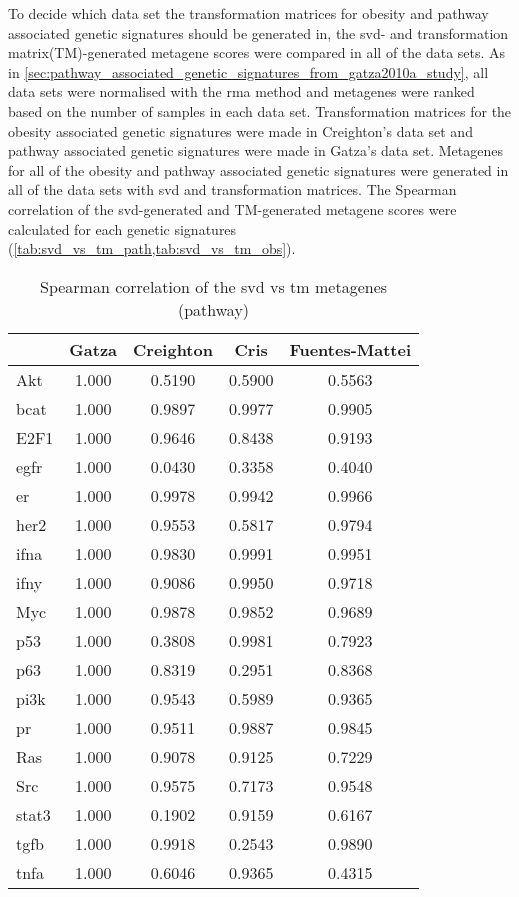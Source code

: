 To decide which data set the transformation matrices for obesity and pathway associated genetic signatures should be generated in, the \gls{svd}- and transformation matrix(TM)-generated metagene scores were compared in all of the data sets.
As in \cref{sec:pathway_associated_genetic_signatures_from_gatza2010a_study}, all data sets were normalised with the \gls{rma} method and metagenes were ranked based on the number of samples in each data set.
Transformation matrices for the obesity associated genetic signatures were made in Creighton's data set and pathway associated genetic signatures were made in Gatza's data set.
Metagenes for all of the obesity and pathway associated genetic signatures were generated in all of the data sets with \gls{svd} and transformation matrices.
The Spearman correlation of the \gls{svd}-generated and TM-generated metagene scores were calculated for each genetic signatures (\cref{tab:svd_vs_tm_path,tab:svd_vs_tm_obs}).

\begin{table}[htpb]
	\centering
	\caption{Spearman correlation of the svd vs tm metagenes (pathway)}
	\label{tab:svd_vs_tm_path}
	\begin{tabular}{lcccc}
		& Gatza & Creighton & Cris & Fuentes-Mattei\\
		\hline
		\rule{0pt}{2.25ex}Akt & 1.000 & 0.5190 & 0.5900 & 0.5563 \\
		\gls{bcat}            & 1.000 & 0.9897 & 0.9977 & 0.9905 \\
		E2F1                  & 1.000 & 0.9646 & 0.8438 & 0.9193 \\
		\gls{egfr}            & 1.000 & 0.0430 & 0.3358 & 0.4040 \\
		\gls{er}              & 1.000 & 0.9978 & 0.9942 & 0.9966 \\
		\gls{her2}            & 1.000 & 0.9553 & 0.5817 & 0.9794 \\
		\gls{ifna}            & 1.000 & 0.9830 & 0.9991 & 0.9951 \\
		\gls{ifny}            & 1.000 & 0.9086 & 0.9950 & 0.9718 \\
		Myc                   & 1.000 & 0.9878 & 0.9852 & 0.9689 \\
		p53                   & 1.000 & 0.3808 & 0.9981 & 0.7923 \\
		p63                   & 1.000 & 0.8319 & 0.2951 & 0.8368 \\
		\gls{pi3k}            & 1.000 & 0.9543 & 0.5989 & 0.9365 \\
		\gls{pr}              & 1.000 & 0.9511 & 0.9887 & 0.9845 \\
		Ras                   & 1.000 & 0.9078 & 0.9125 & 0.7229 \\
		Src                   & 1.000 & 0.9575 & 0.7173 & 0.9548 \\
		\gls{stat3}           & 1.000 & 0.1902 & 0.9159 & 0.6167 \\
		\gls{tgfb}            & 1.000 & 0.9918 & 0.2543 & 0.9890 \\
		\gls{tnfa}            & 1.000 & 0.6046 & 0.9365 & 0.4315 \\

	\end{tabular}
\end{table}

